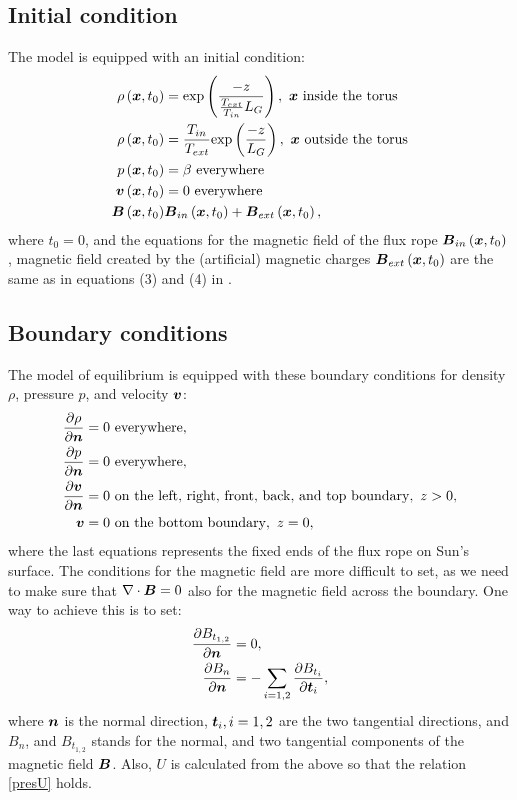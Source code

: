 \subsection{Initial condition}
The model is equipped with an initial condition:
\begin{align}
\label{tdIc}
\rho\left(\mbox{\boldmath $x$}, t_0\right) & = \mathrm{exp}\left(\frac{-z}{\frac{ T_{ext} }{T_{in}}L_G}\right),\ \mbox{\boldmath $x$}\ \text{inside the torus}\\
\rho\left(\mbox{\boldmath $x$}, t_0\right) & = \frac{ T_{in} }{T_{ext}} \mathrm{exp}\left(\frac{-z}{L_G}\right),\ \mbox{\boldmath $x$}\ \text{outside the torus}\\
p\left(\mbox{\boldmath $x$}, t_0\right) & = \beta\ \text{everywhere}\\
\mbox{\boldmath $v$}\left(\mbox{\boldmath $x$}, t_0\right) & = 0\ \text{everywhere}\\
\mbox{\boldmath $B$}\left(\mbox{\boldmath $x$}, t_0\right) & \mbox{\boldmath $B$}_{in}\left(\mbox{\boldmath $x$}, t_0\right) + \mbox{\boldmath $B$}_{ext}\left(\mbox{\boldmath $x$}, t_0\right),
\end{align}
where $t_0 = 0$, and the equations for the magnetic field of the flux rope $\mbox{\boldmath $B$}_{in}\left(\mbox{\boldmath $x$}, t_0\right)$, magnetic field created by the (artificial) magnetic charges $\mbox{\boldmath $B$}_{ext}\left(\mbox{\boldmath $x$}, t_0\right)$ are the same as in equations (3) and (4) in \cite{miraClanek}.
\subsection{Boundary conditions}
The model of equilibrium is equipped with these boundary conditions for density $\rho$, pressure $p$, and velocity $\mbox{\boldmath $v$}$:
\begin{align}
\frac{\partial \rho}{\partial \mbox{\boldmath $n$}} & = 0\ \text{everywhere},\\
\frac{\partial p}{\partial \mbox{\boldmath $n$}} & = 0\ \text{everywhere},\\
\frac{\partial \mbox{\boldmath $v$}}{\partial \mbox{\boldmath $n$}} & = 0\ \text{on the left, right, front, back, and top boundary},\ z > 0,\\
\mbox{\boldmath $v$} & = 0\ \text{on the bottom boundary},\ z = 0,\\
\end{align}
where the last equations represents the fixed ends of the flux rope on Sun's surface.
The conditions for the magnetic field are more difficult to set, as we need to make sure that $\nabla \cdot \mbox{\boldmath $B$} = 0$ also for the magnetic field across the boundary.
One way to achieve this is to set:
\begin{align}
\frac{\partial B_{t_{1,2}}}{\partial \mbox{\boldmath $n$}} & = 0,\\
\frac{\partial B_n}{\partial \mbox{\boldmath $n$}} & = -\sum_{i = 1, 2}\frac{\partial B_{t_{i}}}{\partial \mbox{\boldmath $t$}_{i}},
\end{align}
where $\mbox{\boldmath $n$}$ is the normal direction, $\mbox{\boldmath $t$}_{i}, i = 1, 2$ are the two tangential directions, and $B_n$, and $B_{t_{1,2}}$ stands for the normal, and two tangential components of the magnetic field $\mbox{\boldmath $B$}$. Also, $U$ is calculated from the above so that the relation \cref{presU} holds.

